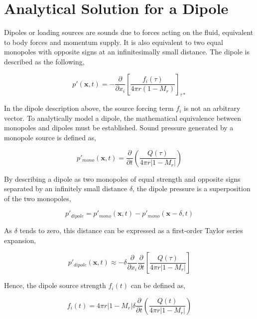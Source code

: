
\section{Analytical Solution for a Dipole} \label{sec:dipole_derivation}

Dipoles or loading sources are sounds due to forces acting on the fluid, equivalent to body forces and momentum supply. It is also equivalent to two equal monopoles with opposite signs at an infinitesimally small distance. The dipole is described as the following,

\begin{equation}
    p'(\bm{x}, t)=-\frac{\partial}{\partial x_i} \left[\frac{f_i(\tau)}{4\pi r(1-M_r)}\right]_{\tau *}
    \label{eq:dipole_convolved}
\end{equation}

In the dipole description above, the source forcing term $f_i$ is not an arbitrary vector. To analytically model a dipole, the mathematical equivalence between monopoles and dipoles must be established. Sound pressure generated by a monopole source is defined as,

\begin{equation*}
    p'_{mono}(\bm{x}, t) = \frac{\partial}{\partial t} \left( \frac{Q(\tau)}{4\pi r|1-M_r|} \right)
\end{equation*}

By describing a dipole as two monopoles of equal strength and opposite signs separated by an infinitely small distance $\delta$, the dipole pressure is a superposition of the two monopoles,

\begin{equation*}
    p'_{dipole}=p'_{mono}(\bm{x},t)-p'_{mono}(\bm{x}-\delta, t)
\end{equation*}

As $\delta$ tends to zero, this distance can be expressed as a first-order Taylor series expansion,

\begin{equation*}
    p'_{dipole}(\bm{x},t) \approx -\delta \frac{\partial}{\partial x_i} \frac{\partial}{\partial t} \left[ \frac{Q(\tau)}{4\pi r|1-M_r|} 
    \right] 
\end{equation*}

Hence, the dipole source strength $f_i(t)$ can be defined as,

\begin{equation}
    f_i(t)=4\pi r|1-M_r| \delta \frac{\partial}{\partial t} \left(\frac{Q(t)}{4\pi r |1-M_r|} \right)
    \label{eq:dipole_source}
\end{equation}

